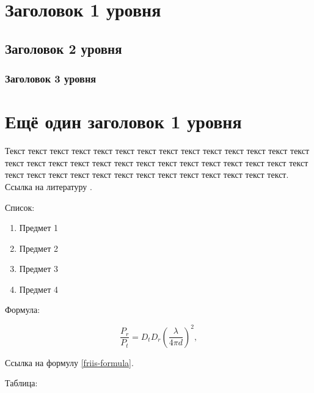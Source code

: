\section{Заголовок 1 уровня}

\subsection{Заголовок 2 уровня}

\subsubsection{Заголовок 3 уровня}

\section{Ещё один заголовок 1 уровня}

Текст текст текст текст текст текст текст текст текст текст текст текст текст текст текст текст текст текст текст текст текст текст текст текст текст текст текст текст текст текст текст текст текст текст текст текст текст текст текст текст текст. Ссылка на литературу \cite{GN-lse}.

Список:

\begin{enumerate}
    \item Предмет 1
    \item Предмет 2
    \item Предмет 3
    \item Предмет 4   
\end{enumerate}

Формула:

\begin{equation} \label{friis-formula}
    \frac{P_r}{P_t} = D_t D_r \left(\frac{\lambda}{4 \pi d}\right) ^ 2,
\end{equation}

Ссылка на формулу \ref{friis-formula}.

Таблица:

